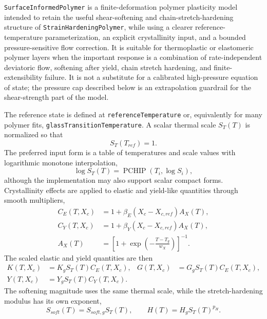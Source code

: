 \texttt{SurfaceInformedPolymer} is a finite-deformation polymer plasticity model intended to retain the useful shear-softening and chain-stretch-hardening structure of \texttt{StrainHardeningPolymer}, while using a clearer reference-temperature parameterization, an explicit crystallinity input, and a bounded pressure-sensitive flow correction.  It is suitable for thermoplastic or elastomeric polymer layers when the important response is a combination of rate-independent deviatoric flow, softening after yield, chain stretch hardening, and finite-extensibility failure.  It is not a substitute for a calibrated high-pressure equation of state; the pressure cap described below is an extrapolation guardrail for the shear-strength part of the model.

The reference state is defined at \texttt{referenceTemperature} or, equivalently for many polymer fits, \texttt{glassTransitionTemperature}.  A scalar thermal scale \(S_T(T)\) is normalized so that
\begin{equation}
  S_T(T_{ref})=1 .
\end{equation}
The preferred input form is a table of temperatures and scale values with logarithmic monotone interpolation,
\begin{equation}
  \log S_T(T)=\operatorname{PCHIP}\left(T_i,\log S_i\right),
  \label{eq:surface-polymer-temperature-scale}
\end{equation}
although the implementation may also support scalar compact forms.  Crystallinity effects are applied to elastic and yield-like quantities through smooth multipliers,
\begin{align}
  C_E(T,X_c) &= 1+\beta_E\left(X_c-X_{c,ref}\right)A_X(T),\\
  C_Y(T,X_c) &= 1+\beta_Y\left(X_c-X_{c,ref}\right)A_X(T),\\
  A_X(T) &= \left[1+\exp\left(-\frac{T-T_g}{w_X}\right)\right]^{-1}.
  \label{eq:surface-polymer-crystallinity}
\end{align}
The scaled elastic and yield quantities are then
\begin{align}
  K(T,X_c) &= K_g S_T(T)C_E(T,X_c), &
  G(T,X_c) &= G_g S_T(T)C_E(T,X_c),\\
  Y(T,X_c) &= Y_g S_T(T)C_Y(T,X_c).
  \label{eq:surface-polymer-scaled-elastic-yield}
\end{align}
The softening magnitude uses the same thermal scale, while the stretch-hardening modulus has its own exponent,
\begin{equation}
  S_{soft}(T)=S_{soft,g}S_T(T),
  \qquad
  H(T)=H_g S_T(T)^{p_H}.
  \label{eq:surface-polymer-softening-hardening-scale}
\end{equation}


